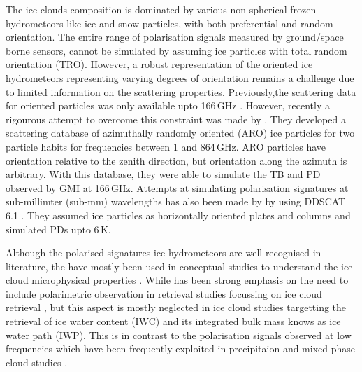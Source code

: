 \documentclass[amt, manuscript]{copernicus}
\begin{document}
The ice clouds composition is dominated by various non-spherical frozen hydrometeors like ice and snow particles, with both preferential and random orientation. The entire range of polarisation signals measured by ground/space borne sensors, cannot be simulated by assuming ice particles with total random orientation (TRO). However, a robust representation of the oriented ice hydrometeors representing varying degrees of orientation remains a challenge due to limited information on the scattering properties. Previously,the scattering data for oriented particles was only available upto 166\,GHz \citep{adams:thesc:12}. However, recently a rigourous attempt to overcome this constraint was made by \citet{brath:micro:20}. They developed a scattering database of azimuthally randomly oriented (ARO) ice particles for two particle habits for frequencies between 1 and 864\,GHz. ARO particles have orientation relative to the zenith direction, but orientation along the azimuth is arbitrary. With this database, they were able to simulate the TB and PD observed by GMI at 166\,GHz. Attempts at simulating polarisation signatures at sub-millimter (sub-mm) wavelengths has also been made by \citet{xie:polar:11} by using DDSCAT 6.1 \citep{}. They assumed ice particles as horizontally oriented plates and columns and simulated PDs upto 6\,K. 

Although the polarised signatures ice hydrometeors are well recognised in literature, the have mostly been used in conceptual studies to understand the ice cloud microphysical properties \citep{gong:micro:17}. While has been strong emphasis on the need to include polarimetric observation in retrieval studies focussing on ice cloud retrieval \citep{xie:polar:11, defer:first:14, gong:micro:17, coy:sensi:20}, but this aspect is  mostly neglected in ice cloud studies targetting the retrieval of ice water content (IWC) and its integrated bulk mass knows as ice water path (IWP). This is in contrast to the polarisation signals observed at low frequencies which have been frequently exploited in precipitaion and mixed phase cloud studies \citep{battaglia:rain:09}. 
\end{document}
